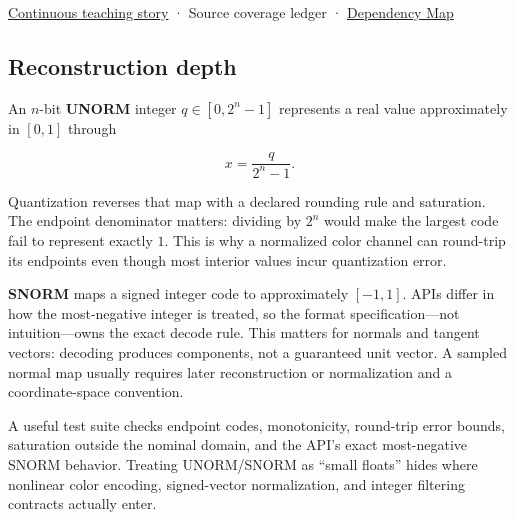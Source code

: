 \hyperref[01-foundations-i-ch001-choosing-what-information-to-keep]{Continuous teaching story} · {Source coverage ledger} · \hyperref[appendix-4ad47bdd269a]{Dependency Map}

\subsection{Reconstruction depth}\label{appendix-b2402c453dac-reconstruction-depth}

An \(n\)-bit \textbf{UNORM} integer \(q\in[0,2^n-1]\) represents a real value approximately in \([0,1]\) through

\[
x = \frac{q}{2^n-1}.
\]

Quantization reverses that map with a declared rounding rule and saturation. The endpoint denominator matters: dividing by \(2^n\) would make the largest code fail to represent exactly \(1\). This is why a normalized color channel can round-trip its endpoints even though most interior values incur quantization error.

\textbf{SNORM} maps a signed integer code to approximately \([-1,1]\). APIs differ in how the most-negative integer is treated, so the format specification---not intuition---owns the exact decode rule. This matters for normals and tangent vectors: decoding produces components, not a guaranteed unit vector. A sampled normal map usually requires later reconstruction or normalization and a coordinate-space convention.

A useful test suite checks endpoint codes, monotonicity, round-trip error bounds, saturation outside the nominal domain, and the API's exact most-negative SNORM behavior. Treating UNORM/SNORM as ``small floats'' hides where nonlinear color encoding, signed-vector normalization, and integer filtering contracts actually enter.
